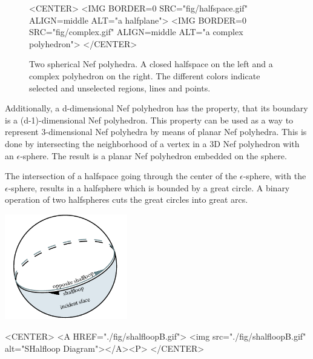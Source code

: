 \begin{figure}[htbp]
\begin{ccTexOnly}
\begin{center}
\end{center}
\end{ccTexOnly}
\caption{Two spherical Nef polyhedra. A closed halfspace on the left 
  and a complex polyhedron on the right. The different colors indicate
  selected and unselected regions, lines and points.}\label{nefsexamples}
\begin{ccHtmlOnly}
<CENTER>
<IMG BORDER=0 SRC="fig/halfspace.gif" ALIGN=middle
ALT="a halfplane">
<IMG BORDER=0 SRC="fig/complex.gif" ALIGN=middle
ALT="a complex polyhedron">
</CENTER>
\end{ccHtmlOnly}
\end{figure}      

Additionally, a d-dimensional Nef polyhedron has the property, that its boundary
is a (d-1)-dimensional Nef polyhedron. This property can be used as a way to
represent 3-dimensional Nef polyhedra by means of planar Nef polyhedra.
This is done by intersecting the neighborhood of a vertex in a 3D Nef polyhedron
with an $\epsilon$-sphere. The result is a planar Nef polyhedron embedded
on the sphere.

The intersection of a halfspace going through the center of the $\epsilon$-sphere,
with the $\epsilon$-sphere, results in a halfsphere which is bounded by
a great circle. A binary operation of two halfspheres cuts the great circles
into great arcs.

\begin{ccTexOnly}
    \vspace{-7mm}
    \begin{center}
      \parbox{0.4\textwidth}{%
          \includegraphics[width=0.4\textwidth]{Nef_S2/fig/shalfloopB}%
      }
    \end{center}
    \vspace{-5mm}
\end{ccTexOnly}

\begin{ccHtmlOnly}
    <CENTER>
    <A HREF="./fig/shalfloopB.gif">
        <img src="./fig/shalfloopB.gif" alt="SHalfloop Diagram"></A><P>
    </CENTER>
\end{ccHtmlOnly}

